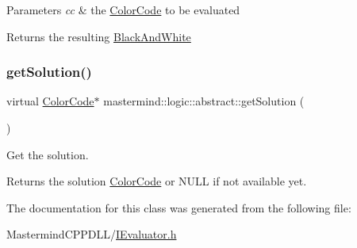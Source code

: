 \begin{DoxyParams}{Parameters}
{\em cc} & the \hyperlink{classmastermind_1_1logic_1_1_color_code}{Color\+Code} to be evaluated \\
\hline
\end{DoxyParams}
\begin{DoxyReturn}{Returns}
the resulting \hyperlink{classmastermind_1_1logic_1_1_black_and_white}{Black\+And\+White} 
\end{DoxyReturn}
\hypertarget{classmastermind_1_1logic_1_1abstract_a3d7e6bdbf8f3926fd42907d86291a373}{}\label{classmastermind_1_1logic_1_1abstract_a3d7e6bdbf8f3926fd42907d86291a373} 
\subsubsection{\texorpdfstring{get\+Solution()}{getSolution()}}
{\footnotesize\ttfamily virtual \hyperlink{classmastermind_1_1logic_1_1_color_code}{Color\+Code}$\ast$ mastermind\+::logic\+::abstract\+::get\+Solution (\begin{DoxyParamCaption}{ }\end{DoxyParamCaption})\hspace{0.3cm}{\ttfamily [pure virtual]}}



Get the solution. 

\begin{DoxyReturn}{Returns}
the solution \hyperlink{classmastermind_1_1logic_1_1_color_code}{Color\+Code} or N\+U\+LL if not available yet. 
\end{DoxyReturn}


The documentation for this class was generated from the following file\+:\begin{DoxyCompactItemize}
\item 
Mastermind\+C\+P\+P\+D\+L\+L/\hyperlink{_i_evaluator_8h}{I\+Evaluator.\+h}\end{DoxyCompactItemize}
